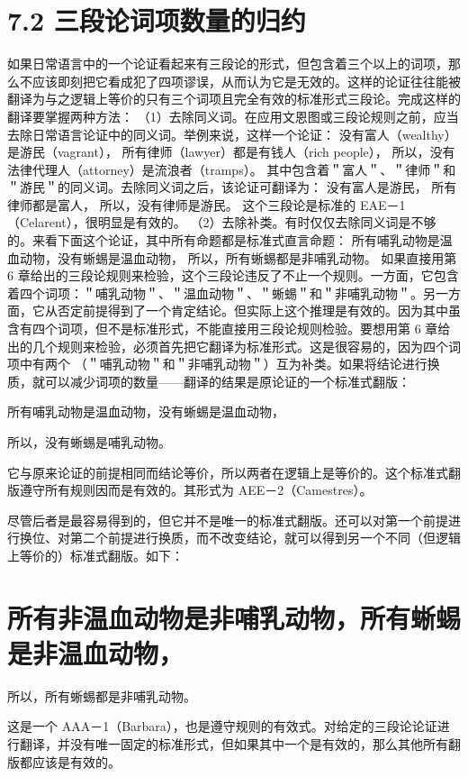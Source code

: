 \section*{7.2 三段论词项数量的归约}
如果日常语言中的一个论证看起来有三段论的形式，但包含着三个以上的词项，那么不应该即刻把它看成犯了四项谬误，从而认为它是无效的。这样的论证往往能被翻译为与之逻辑上等价的只有三个词项且完全有效的标准形式三段论。完成这样的翻译要掌握两种方法：
（1）去除同义词。在应用文恩图或三段论规则之前，应当去除日常语言论证中的同义词。举例来说，这样一个论证：
没有富人（wealthy）是游民（vagrant），
所有律师（lawyer）都是有钱人（rich people），
所以，没有法律代理人（attorney）是流浪者（tramps）。
其中包含着＂富人＂、＂律师＂和＂游民＂的同义词。去除同义词之后，该论证可翻译为：
没有富人是游民，
所有律师都是富人，
所以，没有律师是游民。
这个三段论是标准的 EAE－1（Celarent），很明显是有效的。
（2）去除补类。有时仅仅去除同义词是不够的。来看下面这个论证，其中所有命题都是标准式直言命题：
所有哺乳动物是温血动物，没有蜥蜴是温血动物，
所以，所有蜥蜴都是非哺乳动物。
如果直接用第 6 章给出的三段论规则来检验，这个三段论违反了不止一个规则。一方面，它包含着四个词项：＂哺乳动物＂、＂温血动物＂、＂蜥蜴＂和＂非哺乳动物＂。另一方面，它从否定前提得到了一个肯定结论。但实际上这个推理是有效的。因为其中虽含有四个词项，但不是标准形式，不能直接用三段论规则检验。要想用第 6 章给出的几个规则来检验，必须首先把它翻译为标准形式。这是很容易的，因为四个词项中有两个 （＂哺乳动物＂和＂非哺乳动物＂）互为补类。如果将结论进行换质，就可以减少词项的数量——翻译的结果是原论证的一个标准式翻版：

所有哺乳动物是温血动物，没有蜥蜴是温血动物，

所以，没有蜥蜴是哺乳动物。

它与原来论证的前提相同而结论等价，所以两者在逻辑上是等价的。这个标准式翻版遵守所有规则因而是有效的。其形式为 AEE－2（Camestres）。

尽管后者是最容易得到的，但它并不是唯一的标准式翻版。还可以对第一个前提进行换位、对第二个前提进行换质，而不改变结论，就可以得到另一个不同（但逻辑上等价的）标准式翻版。如下：

\section*{所有非温血动物是非哺乳动物，所有蜥蜴是非温血动物，}
所以，所有蜥蜴都是非哺乳动物。

这是一个 AAA－1（Barbara），也是遵守规则的有效式。对给定的三段论论证进行翻译，并没有唯一固定的标准形式，但如果其中一个是有效的，那么其他所有翻版都应该是有效的。

